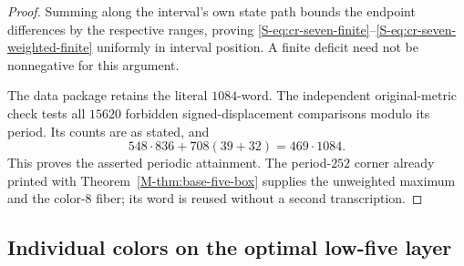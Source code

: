 \documentclass[11pt,reqno]{amsart}
\theoremstyle{plain}
\theoremstyle{plain}
\theoremstyle{plain}
\begin{document}
\begin{proof}
Summing along the interval's own state path bounds the endpoint
differences by the respective ranges, proving
\eqref{S-eq:cr-seven-finite}--\eqref{S-eq:cr-seven-weighted-finite}
uniformly in interval position. A finite deficit need not be
nonnegative for this argument.

The data package retains the literal $1084$-word. The independent
original-metric check tests all $15620$ forbidden signed-displacement
comparisons modulo its period. Its counts are as stated, and
\[
 548\cdot836+708(39+32)=469\cdot1084.
\]
This proves the asserted periodic attainment. The period-$252$
corner already printed with Theorem~\ref*{M-thm:base-five-box} supplies
the unweighted maximum and the color-$8$ fiber; its word is reused
without a second transcription.
\end{proof}

\subsection{Individual colors on the optimal low-five layer}
\label{S-supp:cr-individual-rigidity}
\end{document}
